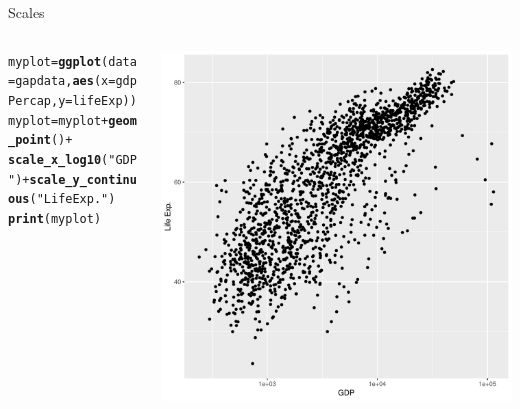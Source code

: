 \documentclass[aspectratio=169]{beamer}\usepackage[]{graphicx}\usepackage[]{color}
\makeatletter
\def\maxwidth{ %
  \ifdim\Gin@nat@width>\linewidth
    \linewidth
  \else
    \Gin@nat@width
  \fi
}
\newcommand{\hlstr}[1]{\textcolor[rgb]{0.192,0.494,0.8}{#1}}%
\newcommand{\hlopt}[1]{\textcolor[rgb]{0,0,0}{#1}}%
\newcommand{\hlstd}[1]{\textcolor[rgb]{0.345,0.345,0.345}{#1}}%
\newcommand{\hlkwb}[1]{\textcolor[rgb]{0.69,0.353,0.396}{#1}}%
\newcommand{\hlkwc}[1]{\textcolor[rgb]{0.333,0.667,0.333}{#1}}%
\newcommand{\hlkwd}[1]{\textcolor[rgb]{0.737,0.353,0.396}{\textbf{#1}}}%
\newenvironment{kframe}{%
 \def\at@end@of@kframe{}%
 \ifinner\ifhmode%
  \def\at@end@of@kframe{\end{minipage}}%
  \begin{minipage}{\columnwidth}%
 \fi\fi%
 \def\FrameCommand##1{\hskip\@totalleftmargin \hskip-\fboxsep
 \colorbox{shadecolor}{##1}\hskip-\fboxsep
     \hskip-\linewidth \hskip-\@totalleftmargin \hskip\columnwidth}%
 \MakeFramed {\advance\hsize-\width
   \@totalleftmargin\z@ \linewidth\hsize
   \@setminipage}}%
 {\par\unskip\endMakeFramed%
 \at@end@of@kframe}
\newenvironment{knitrout}{}{} %
\makeatother
\begin{document}
\begin{frame}[fragile]{Scales}
\begin{columns}
  \begin{column}{0.50\textwidth}
\begin{knitrout}\tiny
{}\color{fgcolor}\begin{kframe}
\begin{alltt}
\hlstd{myplot} \hlkwb{=} \hlkwd{ggplot}\hlstd{(}\hlkwc{data}\hlstd{=gapdata,} \hlkwd{aes}\hlstd{(}\hlkwc{x}\hlstd{=gdpPercap,} \hlkwc{y}\hlstd{=lifeExp))}
\hlstd{myplot} \hlkwb{=} \hlstd{myplot} \hlopt{+} \hlkwd{geom_point}\hlstd{()} \hlopt{+}
  \hlkwd{scale_x_log10}\hlstd{(}\hlstr{"GDP"}\hlstd{)} \hlopt{+} \hlkwd{scale_y_continuous}\hlstd{(}\hlstr{"Life Exp."}\hlstd{)}
\hlkwd{print}\hlstd{(myplot)}
\end{alltt}
\end{kframe}
\end{knitrout}
  \end{column}
  \begin{column}{0.5\textwidth}
\begin{knitrout}\scriptsize
{}\color{fgcolor}
\includegraphics[width=\maxwidth]{figure/unnamed-chunk-25-1} 

\end{knitrout}
  \end{column}
\end{columns}
\end{frame}
\end{document}
